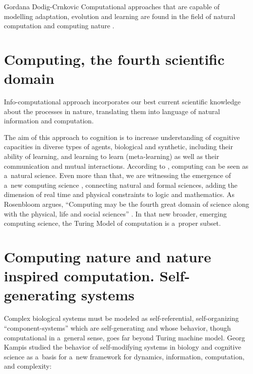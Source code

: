 \begin{artengenv}{Gordana Dodig-Crnkovic}
{}
Computational approaches that are capable of modelling adaptation, evolution and learning are found in the field of natural computation and computing nature
\parencite[][]{dodig-crnkovic_modeling_2014}.%


\section*{Computing, the fourth scientific domain}
Info-computational approach incorporates our best current scientific knowledge about the processes in nature, translating them into language of natural information and computation.

The aim of this approach to cognition is to increase understanding of cognitive capacities in diverse types of agents, biological and synthetic, including their ability of learning, and learning to learn (meta-learning)
\parencite{dodig-crnkovic_natural_2020}
as well as their communication and mutual interactions. According to 
\parencite{denning_computing_2007},
computing can be seen as a~natural science. Even more than that, we are witnessing the emergence of a~new computing science
\parencite{denning_computing_2010}
, connecting natural and formal sciences, adding the dimension of real time and physical constraints to logic and mathematics. As Rosenbloom argues, ``Computing may be the fourth great domain of science along with the physical, life and social sciences''
\parencite{rosenbloom_computing_2015}.
In that new broader, emerging computing science, the Turing Model of computation is a~proper subset.

\section*{Computing nature and nature inspired computation. Self-generating systems}
Complex biological systems must be modeled as self-referential, self-organizing ``component-systems''
\parencite[][]{kampis_self-modifying_1991} %
 which are self-generating and whose behavior, though computational in a~general sense, goes far beyond Turing machine model. Georg Kampis studied the behavior of self-modifying systems in biology and cognitive science as a~basis for a~new framework for dynamics, information, computation, and complexity:


\end{artengenv}
